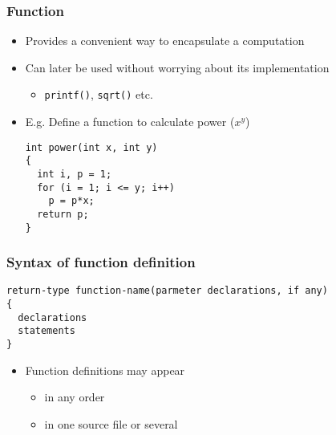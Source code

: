 \documentclass[11pt]{beamer}
\begin{document}
\begin{frame}[fragile]\frametitle{Function}
\label{sec-1-6}

\begin{itemize}
\item Provides a convenient way to encapsulate a computation
\item Can later be used without worrying about its implementation
\begin{itemize}
\item \verb~printf()~, \verb~sqrt()~ etc.
\end{itemize}
\item E.g. Define a function to calculate power ($x^y$)

\begin{verbatim}
int power(int x, int y)
{
  int i, p = 1;
  for (i = 1; i <= y; i++)
    p = p*x;
  return p;
}
\end{verbatim}
\end{itemize}
\end{frame}
\begin{frame}[fragile]\frametitle{Syntax of function definition}
\label{sec-1-7}

\begin{verbatim}
return-type function-name(parmeter declarations, if any)
{
  declarations 
  statements
}
\end{verbatim}

\begin{itemize}
\item Function definitions may appear
\begin{itemize}
\item in any order
\item in one source file or several
\end{itemize}
\end{itemize}
\end{frame}
\end{document}
